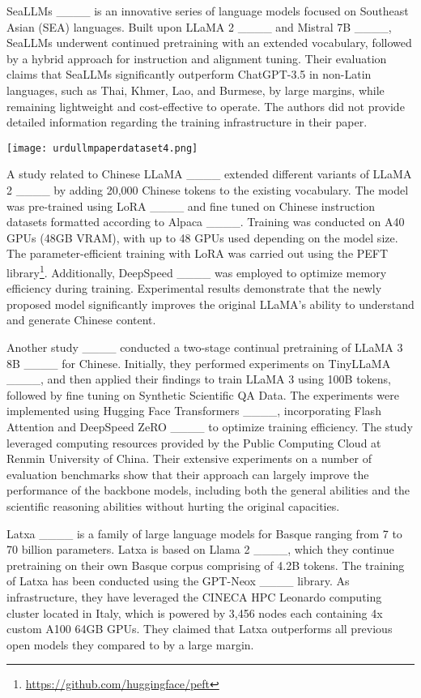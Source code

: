 SeaLLMs ____ is an innovative series of language models focused on Southeast Asian (SEA) languages. Built upon LLaMA 2 ____ and Mistral 7B ____, SeaLLMs underwent continued pretraining with an extended vocabulary, followed by a hybrid approach for instruction and alignment tuning. Their evaluation claims that SeaLLMs significantly outperform ChatGPT-3.5 in non-Latin languages, such as Thai, Khmer, Lao, and Burmese, by large margins, while remaining lightweight and cost-effective to operate. The authors did not provide detailed information regarding the training infrastructure in their paper.

\begin{figure*}[!t]
    \centering
    \texttt{[image: urdullmpaperdataset4.png]} 
    \caption{Development of UrduLLaMA 1.0}
    \label{fig:example-image}
\end{figure*} 


A study related to Chinese LLaMA ____ extended different variants of LLaMA 2 ____ by adding 20,000 Chinese tokens to the existing vocabulary. The model was pre-trained using LoRA ____ and fine tuned on Chinese instruction datasets formatted according to Alpaca ____. Training was conducted on A40 GPUs (48GB VRAM), with up to 48 GPUs used depending on the model size. The parameter-efficient training with LoRA was carried out using the PEFT library\footnote{\url{https://github.com/huggingface/peft}}. Additionally, DeepSpeed ____ was employed to optimize memory efficiency during training. Experimental results demonstrate that the newly proposed model significantly improves the original LLaMA's ability to understand and generate Chinese content.

Another study ____ conducted a two-stage continual pretraining of LLaMA 3 8B ____ for Chinese. Initially, they performed experiments on TinyLLaMA ____, and then applied their findings to train LLaMA 3 using 100B tokens, followed by fine tuning on Synthetic Scientific QA Data. The experiments were implemented using Hugging Face Transformers ____, incorporating Flash Attention and DeepSpeed ZeRO ____ to optimize training efficiency. The study leveraged computing resources provided by the Public Computing Cloud at Renmin University of China. Their extensive experiments on a number
of evaluation benchmarks show that their approach can largely improve the performance of the backbone models, including both the general abilities and the scientific reasoning abilities without hurting the original capacities.

Latxa ____ is a family of large language models for Basque ranging from 7 to 70 billion parameters. Latxa is based on Llama 2 ____, which they continue pretraining on their own Basque corpus comprising of 4.2B tokens.  The training of Latxa has been conducted using the GPT-Neox ____ library. As infrastructure, they have leveraged the CINECA HPC Leonardo computing cluster located in Italy, which is powered by 3,456 nodes each containing 4x custom A100 64GB GPUs. They claimed that Latxa outperforms all previous open models they compared to by a large margin. 

